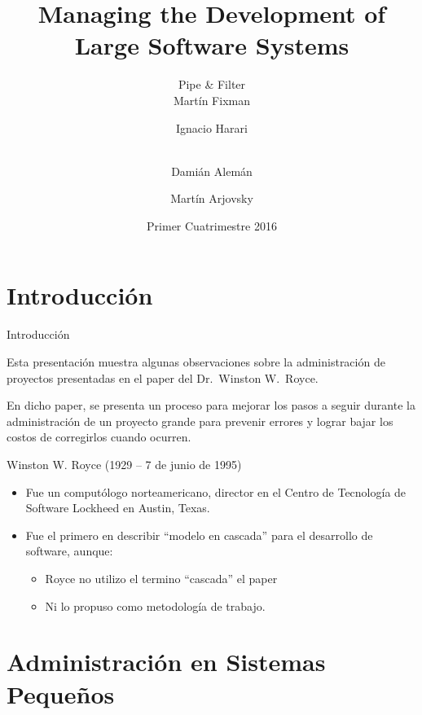 \documentclass{beamer}
\title{Managing the Development of Large Software Systems}
\author[Pipe \& Filter]{%
	{\Large Pipe \& Filter} \\ \vspace{1em}
	Martín Fixman\inst{1} \and
	Ignacio Harari\inst{1} \and \\
	Damián Alemán\inst{1} \and
	Martín Arjovsky\inst{1}
}
\institute{\inst{1} Facultad de Ciencias Exactas y Naturales}
\date{Primer Cuatrimestre 2016}
\begin{document}
\begin{frame}[fragile]
\titlepage{}
\end{frame}

\section{Introducción}

\begin{frame}[fragile]{Introducción}

Esta presentación muestra algunas observaciones sobre la administración de proyectos presentadas en el paper del {\large Dr.\ Winston W.\ Royce}\cite{royce70}.

\bigskip

En dicho paper, se presenta un proceso para mejorar los pasos a seguir durante la administración de un proyecto grande para prevenir errores y lograr bajar los costos de corregirlos cuando ocurren.

\end{frame}

\begin{frame}
Winston W. Royce (1929 – 7 de junio de 1995)

\begin{itemize}

\item Fue un computólogo norteamericano, director en el Centro de Tecnología de Software Lockheed en Austin, Texas.

\item Fue el primero en describir ``modelo en cascada'' para el desarrollo de software, aunque: 
\begin{itemize}
\item Royce no utilizo el termino ``cascada'' el paper
\item Ni lo propuso como metodología de trabajo.
\end{itemize}
\end{itemize}

\end{frame}

\section{Administración en Sistemas Pequeños}
\end{document}
